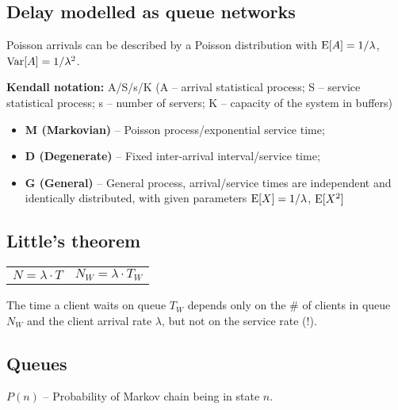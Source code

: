 \documentclass{form}
\begin{document}
\noindent
\begin{minipage}[c]{0.640\textwidth}
    \subsection*{Delay modelled as queue networks}

    Poisson arrivals can be described by a Poisson distribution with $\operatorname{E}[A]=1/\lambda$, $\operatorname{Var}[A]=1/\lambda^2$.

    \noindent
    \textbf{Kendall notation:} A/S/s/K (A -- arrival statistical process; S -- service statistical process; s -- number of servers; K -- capacity of the system in buffers)

    \noindent
    \begin{itemize}
        \setlength\itemsep{0em}
        \item \textbf{M (Markovian)} -- Poisson process/exponential service time;
        \item \textbf{D (Degenerate)} -- Fixed inter-arrival interval/service time;
        \item \textbf{G (General)} -- General process, arrival/service times are independent and identically distributed, with given parameters $\operatorname{E}[X]=1/\lambda$, $\operatorname{E}[X^2]$
    \end{itemize}
\end{minipage}
\begin{minipage}[c]{0.350\textwidth}
    \subsection*{Little's theorem}
    \vspace{-0.5em}
    \begin{tabular}{@{}c c@{}}
        $N = \lambda \cdot T$ &
        $N_W = \lambda \cdot T_W$
    \end{tabular}
    \vspace{0.5em}

    The time a client waits on queue $T_W$ depends only on the \# of clients in queue $N_W$ and the client arrival rate $\lambda$, but not on the service rate (!).

    \subsection*{Queues}
    $P(n)$ -- Probability of Markov chain being in state $n$.
\end{minipage}%
\end{document}
